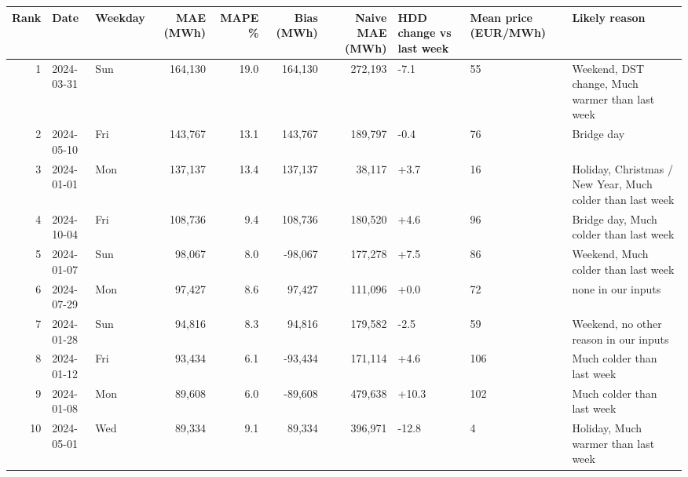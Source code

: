 \begin{tabular}{rllrrrrlll}
\toprule
Rank & Date & Weekday & MAE (MWh) & MAPE \% & Bias (MWh) & Naive MAE (MWh) & HDD change vs last week & Mean price (EUR/MWh) & Likely reason \\
\midrule
1 & 2024-03-31 & Sun & 164,130 & 19.0 & 164,130 & 272,193 & -7.1 & 55 & Weekend, DST change, Much warmer than last week \\
2 & 2024-05-10 & Fri & 143,767 & 13.1 & 143,767 & 189,797 & -0.4 & 76 & Bridge day \\
3 & 2024-01-01 & Mon & 137,137 & 13.4 & 137,137 & 38,117 & +3.7 & 16 & Holiday, Christmas / New Year, Much colder than last week \\
4 & 2024-10-04 & Fri & 108,736 & 9.4 & 108,736 & 180,520 & +4.6 & 96 & Bridge day, Much colder than last week \\
5 & 2024-01-07 & Sun & 98,067 & 8.0 & -98,067 & 177,278 & +7.5 & 86 & Weekend, Much colder than last week \\
6 & 2024-07-29 & Mon & 97,427 & 8.6 & 97,427 & 111,096 & +0.0 & 72 & none in our inputs \\
7 & 2024-01-28 & Sun & 94,816 & 8.3 & 94,816 & 179,582 & -2.5 & 59 & Weekend, no other reason in our inputs \\
8 & 2024-01-12 & Fri & 93,434 & 6.1 & -93,434 & 171,114 & +4.6 & 106 & Much colder than last week \\
9 & 2024-01-08 & Mon & 89,608 & 6.0 & -89,608 & 479,638 & +10.3 & 102 & Much colder than last week \\
10 & 2024-05-01 & Wed & 89,334 & 9.1 & 89,334 & 396,971 & -12.8 & 4 & Holiday, Much warmer than last week \\
\bottomrule
\end{tabular}
